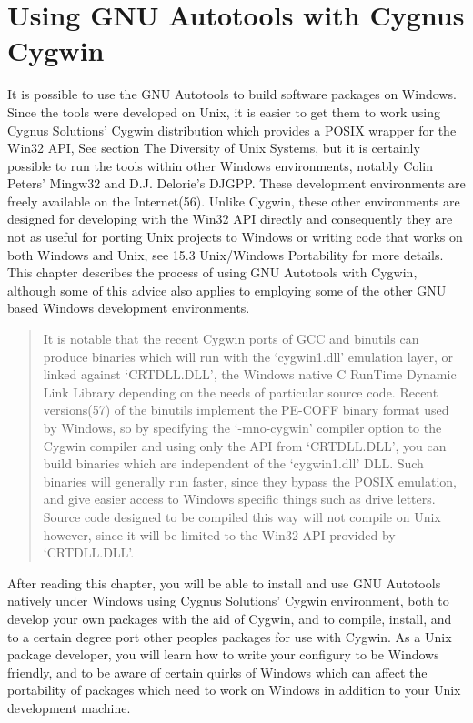 \chapter{Using GNU Autotools with Cygnus Cygwin}

It is possible to use the GNU Autotools to build software packages on Windows. Since the tools were developed on Unix, it is easier to get them to work using Cygnus Solutions' Cygwin distribution which provides a POSIX wrapper for the Win32 API, See section The Diversity of Unix Systems, but it is certainly possible to run the tools within other Windows environments, notably Colin Peters' Mingw32 and D.J. Delorie's DJGPP. These development environments are freely available on the Internet(56). Unlike Cygwin, these other environments are designed for developing with the Win32 API directly and consequently they are not as useful for porting Unix projects to Windows or writing code that works on both Windows and Unix, see 15.3 Unix/Windows Portability for more details. This chapter describes the process of using GNU Autotools with Cygwin, although some of this advice also applies to employing some of the other GNU based Windows development environments. 

\begin{quote}
It is notable that the recent Cygwin ports of GCC and binutils can produce binaries which will run with the `cygwin1.dll' emulation layer, or linked against `CRTDLL.DLL', the Windows native C RunTime Dynamic Link Library depending on the needs of particular source code. Recent versions(57) of the binutils implement the PE-COFF binary format used by Windows, so by specifying the `-mno-cygwin' compiler option to the Cygwin compiler and using only the API from `CRTDLL.DLL', you can build binaries which are independent of the `cygwin1.dll' DLL. Such binaries will generally run faster, since they bypass the POSIX emulation, and give easier access to Windows specific things such as drive letters. Source code designed to be compiled this way will not compile on Unix however, since it will be limited to the Win32 API provided by `CRTDLL.DLL'.
\end{quote}

After reading this chapter, you will be able to install and use GNU Autotools natively under Windows using Cygnus Solutions' Cygwin environment, both to develop your own packages with the aid of Cygwin, and to compile, install, and to a certain degree port other peoples packages for use with Cygwin. As a Unix package developer, you will learn how to write your configury to be Windows friendly, and to be aware of certain quirks of Windows which can affect the portability of packages which need to work on Windows in addition to your Unix development machine.

